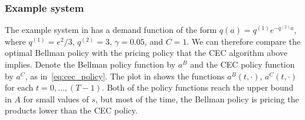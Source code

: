 \documentclass[main.tex]{subfiles}
\begin{document}
\subsubsection{Example system}\label{subsec:cec_comparison_example}
The example system in 
has a demand
function of the form $q(a)=q^{(1)}e^{-q^{(2)}a}$, where $q^{(1)}=e^2/3$,
$q^{(2)}=3$, $\gamma = 0.05$, and $C=1$. We can therefore
compare the optimal Bellman policy with the
pricing policy that the CEC algorithm above implies.
Denote the Bellman policy function by $a^B$ and the CEC policy
function by $a^C$, as in~\eqref{eq:cec_policy}.
The plot in
 shows the functions
$a^B(t,\cdot)$, $a^C(t,\cdot)$ for each $t=0,\dots,(T-1)$.
Both of the policy functions reach the upper bound in $A$ for small values
of $s$, but most of the time, the Bellman policy is pricing the products
lower than the CEC policy.
\end{document}
